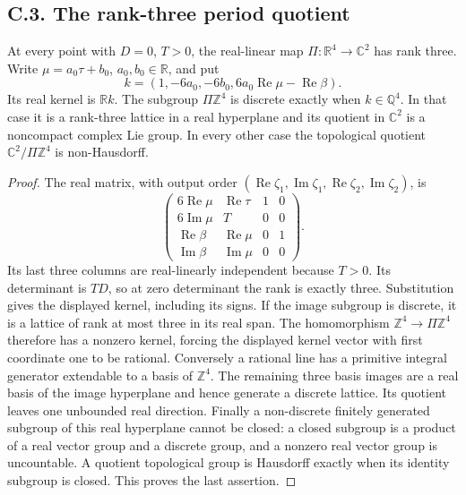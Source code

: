 \subsection{C.3. The rank-three period quotient}
\begin{proposition}\label{fam:src:C.3.1}\label{fam:st:C.3.1}
At every point with \(D=0\), \(T>0\), the real-linear map
\(\Pi:\mathbb R^4\to\mathbb C^2\) has rank three. Write
\(\mu=a_0\tau+b_0\), \(a_0,b_0\in\mathbb R\), and put
\[
 k=(1,-6a_0,-6b_0,6a_0\operatorname{Re}\mu-\operatorname{Re}\beta).
\]
Its real kernel is \(\mathbb R k\). The subgroup \(\Pi\mathbb Z^4\) is
discrete exactly when \(k\in\mathbb Q^4\). In that case it is a
rank-three lattice in a real hyperplane and its quotient in \(\mathbb C^2\)
is a noncompact complex Lie group. In every other case the topological
quotient \(\mathbb C^2/\Pi\mathbb Z^4\) is non-Hausdorff.
\end{proposition}
\begin{proof}
The real matrix, with output order
\((\operatorname{Re}\zeta_1,\operatorname{Im}\zeta_1,
\operatorname{Re}\zeta_2,\operatorname{Im}\zeta_2)\), is
\[
 \begin{pmatrix}6\operatorname{Re}\mu&\operatorname{Re}\tau&1&0\\
 6\operatorname{Im}\mu&T&0&0\\
 \operatorname{Re}\beta&\operatorname{Re}\mu&0&1\\
 \operatorname{Im}\beta&\operatorname{Im}\mu&0&0\end{pmatrix}.
\]
Its last three columns are real-linearly independent because \(T>0\).
Its determinant is \(TD\), so at zero determinant the rank is exactly
three. Substitution gives the displayed kernel, including its signs.
If the image subgroup is discrete, it is a lattice of rank at most three
in its real span. The homomorphism \(\mathbb Z^4\to\Pi\mathbb Z^4\)
therefore has a nonzero kernel, forcing the displayed kernel vector with
first coordinate one to be rational. Conversely a rational line has a
primitive integral generator extendable to a basis of \(\mathbb Z^4\).
The remaining three basis images are a real basis of the image hyperplane
and hence generate a discrete lattice. Its quotient leaves one unbounded
real direction. Finally a non-discrete finitely generated subgroup of
this real hyperplane cannot be closed: a closed subgroup is a product of
a real vector group and a discrete group, and a nonzero real vector group
is uncountable. A quotient topological group is Hausdorff exactly when its
identity subgroup is closed. This proves the last assertion.
\end{proof}

